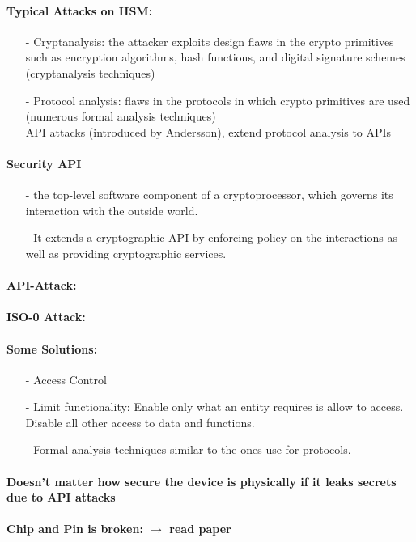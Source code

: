 \paragraph{Typical Attacks on HSM:}
\begin{itemize}
    \item[-]Cryptanalysis: the attacker exploits design flaws in the crypto primitives such
    as encryption algorithms, hash functions, and digital signature schemes (cryptanalysis techniques)
    \item[-]Protocol analysis: flaws in the protocols in which crypto primitives are used (numerous formal analysis techniques)\\
    API attacks (introduced by Andersson), extend protocol
    analysis to APIs
\end{itemize}{}

\paragraph{Security API}
\begin{itemize}
    \item[-]the top-level software component of a
    cryptoprocessor, which governs its interaction with the outside world.
    \item[-]It extends a cryptographic API by enforcing policy on the interactions as well as providing cryptographic services.
\end{itemize}{}

\paragraph{API-Attack: }

\paragraph{ISO-0 Attack:}

\paragraph{Some Solutions: }
\begin{itemize}
    \item[-]Access Control
    \item[-]Limit functionality: Enable only what an entity
    requires is allow to access. Disable all other access to
    data and functions.
    \item[-]Formal analysis techniques similar to the ones use for protocols.
\end{itemize}{}

\paragraph{Doesn't matter how secure the device is physically if it leaks secrets due to API attacks}

\paragraph{Chip and Pin is broken: $\rightarrow$ read paper}

